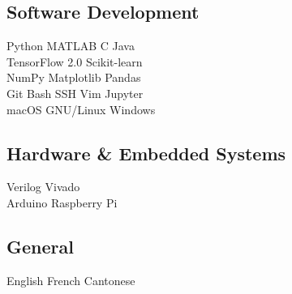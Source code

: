 \begin{minipage}[t]{0.33\textwidth}
 \subsection{Software Development}
 Python \textbullet{}  MATLAB  \textbullet{} C \textbullet{} Java\\
 TensorFlow 2.0 \textbullet{} Scikit-learn \\
 NumPy \textbullet{} Matplotlib \textbullet{} Pandas\\
 Git \textbullet{} Bash \textbullet{} SSH \textbullet{} Vim \textbullet{} Jupyter\\ %
 macOS \textbullet{} GNU/Linux \textbullet{} Windows\\

 \sectionspace %

 \subsection{Hardware \& Embedded Systems}
 Verilog \textbullet{} Vivado \\
 Arduino \textbullet{} Raspberry Pi

 \sectionspace %

 \subsection{General}
 English \textbullet{} French \textbullet{} Cantonese\\

 \sectionspace %


\end{minipage}
